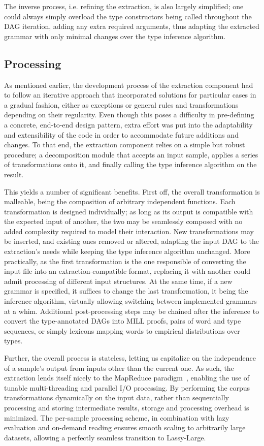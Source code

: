The inverse process, i.e. refining the extraction, is also largely simplified; one could always simply overload the type constructors being called throughout the DAG iteration, adding any extra required arguments, thus adapting the extracted grammar with only minimal changes over the type inference algorithm.

\subsection{Processing}
As mentioned earlier, the development process of the extraction component had to follow an iterative approach that incorporated solutions for particular cases in a gradual fashion, either as exceptions or general rules and transformations depending on their regularity.
Even though this poses a difficulty in pre-defining a concrete, end-to-end design pattern, extra effort was put into the adaptability and extensibility of the code in order to accommodate future additions and changes.
To that end, the extraction component relies on a simple but robust procedure; a decomposition module that accepts an input sample, applies a series of transformations onto it, and finally calling the type inference algorithm on the result.

This yields a number of significant benefits.
First off, the overall transformation is malleable, being the composition of arbitrary independent functions.
Each transformation is designed individually; as long as its output is compatible with the expected input of another, the two may be seamlessly composed with no added complexity required to model their interaction.
New transformations may be inserted, and existing ones removed or altered, adapting the input DAG to the extraction's needs while keeping the type inference algorithm unchanged.
More practically, as the first transformation is the one responsible of converting the input file into an extraction-compatible format, replacing it with another could admit processing of different input structures.
At the same time, if a new grammar is specified, it suffices to change the last transformation, it being the inference algorithm, virtually allowing switching between implemented grammars at a whim.
Additional post-processing steps may be chained after the inference to convert the type-annotated DAGs into MILL proofs, pairs of word and type sequences, or simply lexicons mapping words to empirical distributions over types. 

Further, the overall process is stateless, letting us capitalize on the independence of a sample's output from inputs other than the current one. 
As such, the extraction lends itself nicely to the MapReduce paradigm~\cite{dean2008mapreduce}, enabling the use of tunable multi-threading and parallel I/O processing.
By performing the corpus transformations dynamically on the input data, rather than sequentially processing and storing intermediate results, storage and processing overhead is minimized. 
The per-sample processing scheme, in combination with lazy evaluation and on-demand reading ensures smooth scaling to arbitrarily large datasets, allowing a perfectly seamless transition to Lassy-Large.

